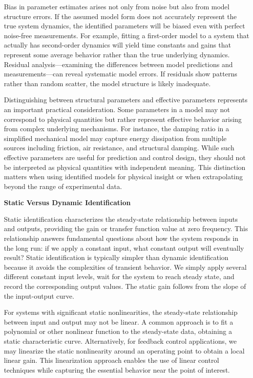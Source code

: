 Bias in parameter estimates arises not only from noise but also from model structure errors. If the assumed model form does not accurately represent the true system dynamics, the identified parameters will be biased even with perfect noise-free measurements. For example, fitting a first-order model to a system that actually has second-order dynamics will yield time constants and gains that represent some average behavior rather than the true underlying dynamics. Residual analysis—examining the differences between model predictions and measurements—can reveal systematic model errors. If residuals show patterns rather than random scatter, the model structure is likely inadequate.

Distinguishing between structural parameters and effective parameters represents an important practical consideration. Some parameters in a model may not correspond to physical quantities but rather represent effective behavior arising from complex underlying mechanisms. For instance, the damping ratio in a simplified mechanical model may capture energy dissipation from multiple sources including friction, air resistance, and structural damping. While such effective parameters are useful for prediction and control design, they should not be interpreted as physical quantities with independent meaning. This distinction matters when using identified models for physical insight or when extrapolating beyond the range of experimental data.

\textbf{Static Versus Dynamic Identification}

Static identification characterizes the steady-state relationship between inputs and outputs, providing the gain or transfer function value at zero frequency. This relationship answers fundamental questions about how the system responds in the long run: if we apply a constant input, what constant output will eventually result? Static identification is typically simpler than dynamic identification because it avoids the complexities of transient behavior. We simply apply several different constant input levels, wait for the system to reach steady state, and record the corresponding output values. The static gain follows from the slope of the input-output curve.

For systems with significant static nonlinearities, the steady-state relationship between input and output may not be linear. A common approach is to fit a polynomial or other nonlinear function to the steady-state data, obtaining a static characteristic curve. Alternatively, for feedback control applications, we may linearize the static nonlinearity around an operating point to obtain a local linear gain. This linearization approach enables the use of linear control techniques while capturing the essential behavior near the point of interest.

